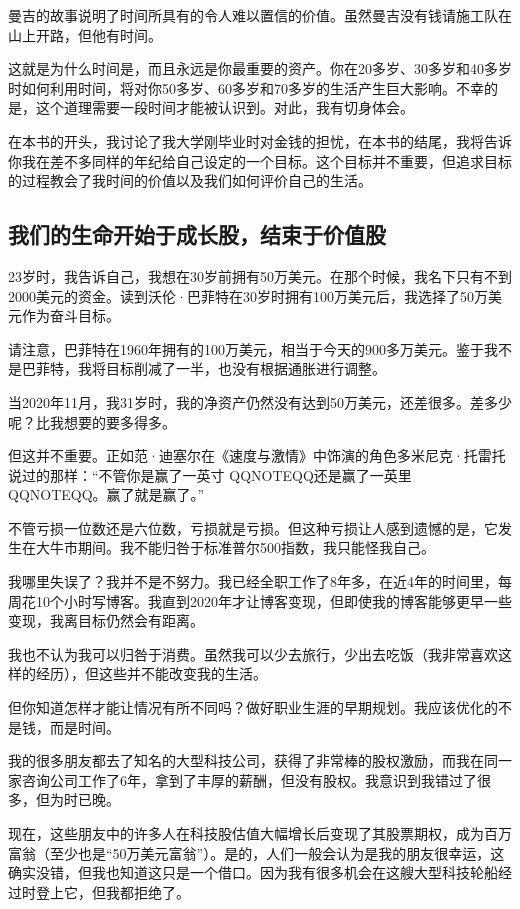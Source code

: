 曼吉的故事说明了时间所具有的令人难以置信的价值。虽然曼吉没有钱请施工队在山上开路，但他有时间。

这就是为什么时间是，而且永远是你最重要的资产。你在20多岁、30多岁和40多岁时如何利用时间，将对你50多岁、60多岁和70多岁的生活产生巨大影响。不幸的是，这个道理需要一段时间才能被认识到。对此，我有切身体会。

在本书的开头，我讨论了我大学刚毕业时对金钱的担忧，在本书的结尾，我将告诉你我在差不多同样的年纪给自己设定的一个目标。这个目标并不重要，但追求目标的过程教会了我时间的价值以及我们如何评价自己的生活。

\subsection{我们的生命开始于成长股，结束于价值股}

23岁时，我告诉自己，我想在30岁前拥有50万美元。在那个时候，我名下只有不到2000美元的资金。读到沃伦·巴菲特在30岁时拥有100万美元后，我选择了50万美元作为奋斗目标。

请注意，巴菲特在1960年拥有的100万美元，相当于今天的900多万美元。鉴于我不是巴菲特，我将目标削减了一半，也没有根据通胀进行调整。

当2020年11月，我31岁时，我的净资产仍然没有达到50万美元，还差很多。差多少呢？比我想要的要多得多。

但这并不重要。正如范·迪塞尔在《速度与激情》中饰演的角色多米尼克·托雷托说过的那样：“不管你是赢了一英寸 QQNOTEQQ还是赢了一英里 QQNOTEQQ。赢了就是赢了。”

不管亏损一位数还是六位数，亏损就是亏损。但这种亏损让人感到遗憾的是，它发生在大牛市期间。我不能归咎于标准普尔500指数，我只能怪我自己。

我哪里失误了？我并不是不努力。我已经全职工作了8年多，在近4年的时间里，每周花10个小时写博客。我直到2020年才让博客变现，但即使我的博客能够更早一些变现，我离目标仍然会有距离。

我也不认为我可以归咎于消费。虽然我可以少去旅行，少出去吃饭（我非常喜欢这样的经历），但这些并不能改变我的生活。

但你知道怎样才能让情况有所不同吗？做好职业生涯的早期规划。我应该优化的不是钱，而是时间。

我的很多朋友都去了知名的大型科技公司，获得了非常棒的股权激励，而我在同一家咨询公司工作了6年，拿到了丰厚的薪酬，但没有股权。我意识到我错过了很多，但为时已晚。

现在，这些朋友中的许多人在科技股估值大幅增长后变现了其股票期权，成为百万富翁（至少也是“50万美元富翁”）。是的，人们一般会认为是我的朋友很幸运，这确实没错，但我也知道这只是一个借口。因为我有很多机会在这艘大型科技轮船经过时登上它，但我都拒绝了。

